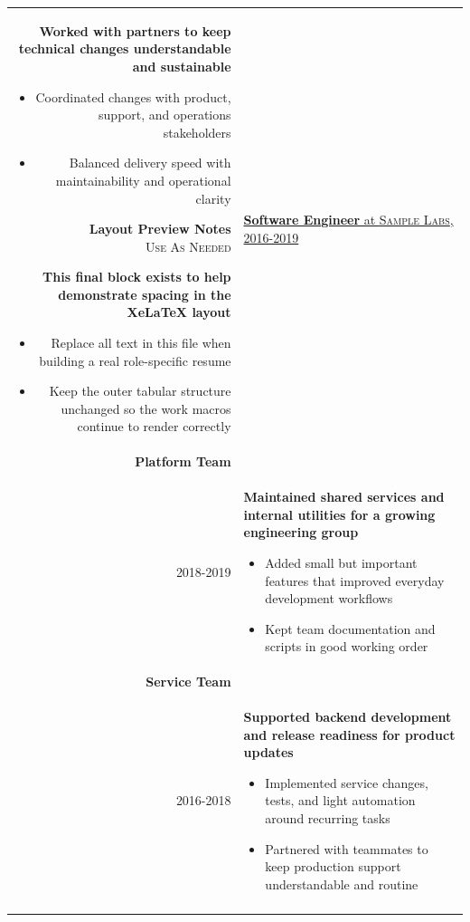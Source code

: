 \documentclass[letterpaper,10pt]{article} %
\newcommand{\work}[4]{\textsc{#1} & \underline{\textbf{#2} at \textsc{#3}}\\ 
\\
& #4\\
\multicolumn{2}{c}{} \\}
\newcommand{\workTwo}[9]{& \underline{\textbf{#2} at \textsc{#3},  \textsc{#1}}\\
\textbf{#4} \\
\textsc{#5} & #6\\
\textbf{#7} \\
\textsc{#8} & #9 \\
\multicolumn{2}{c}{} \\}
\begin{document}
\begin{tabular}{r|p{14.5cm}}
{\textbf{Worked with partners to keep technical changes understandable and sustainable}
\begin{itemize}
	\item{Coordinated changes with product, support, and operations stakeholders}
	\item{Balanced delivery speed with maintainability and operational clarity}
\end{itemize}
}
{\textbf{ Layout Preview Notes } 
\\
 \textsc{Use As Needed}}{
\textbf{This final block exists to help demonstrate spacing in the XeLaTeX layout}
\begin{itemize}
	\item{Replace all text in this file when building a real role-specific resume}
	\item{Keep the outer tabular structure unchanged so the work macros continue to render correctly}
\end{itemize}
}


\workTwo{2016-2019}{Software Engineer}{Sample Labs}
{ Platform Team }{2018-2019}{

\textbf{Maintained shared services and internal utilities for a growing engineering group}
\begin{itemize}
	\item{Added small but important features that improved everyday development workflows}
	\item{Kept team documentation and scripts in good working order}
\end{itemize} 
}
{ Service Team}{2016-2018}{
\textbf{Supported backend development and release readiness for product updates}
\begin{itemize}
	\item{Implemented service changes, tests, and light automation around recurring tasks}
	\item{Partnered with teammates to keep production support understandable and routine}
\end{itemize}
}

\end{tabular}
\vspace{-7mm} %

\end{document}
